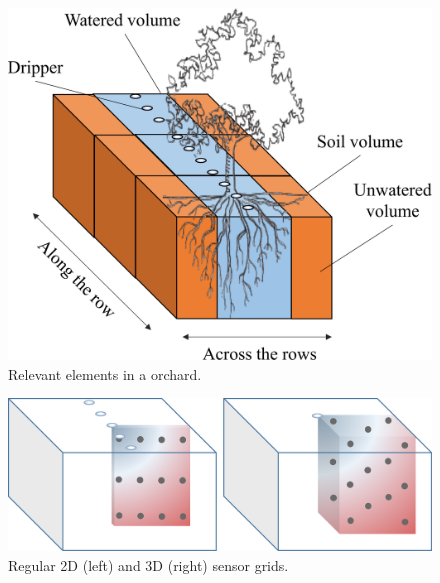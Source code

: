 \begin{figure}[t]
\centering
\includegraphics[scale=.14]{chapters/physics-aware/pluto/img/SoilVolume2.pdf}
\caption{Relevant elements in a orchard.}
\label{pluto-fig:soilvolume}
\end{figure}

\begin{figure}[t]
\centering
\includegraphics[scale=.21]{chapters/physics-aware/pluto/img/SensorGrid2.pdf}
\caption{Regular 2D (left) and 3D (right) sensor grids.}
\label{pluto-fig:sensorgrid}
\end{figure}

